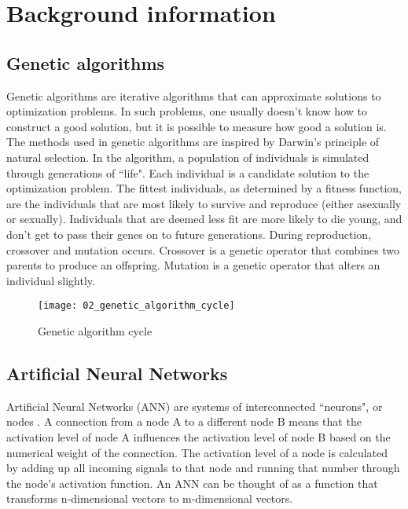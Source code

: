 \chapter{Background information}

\section{Genetic algorithms}
Genetic algorithms \citep{goldberg1989} are iterative algorithms that can approximate solutions to optimization problems. In such problems, one usually doesn’t know how to construct a good solution, but it is possible to measure how good a solution is. The methods used in genetic algorithms are inspired by Darwin's principle of natural selection. In the algorithm, a population of individuals is simulated through generations of ``life". Each individual is a candidate solution to the optimization problem. The fittest individuals, as determined by a fitness function, are the individuals that are most likely to survive and reproduce (either asexually or sexually). Individuals that are deemed less fit are more likely to die young, and don't get to pass their genes on to future generations. During reproduction, crossover and mutation occurs. Crossover is a genetic operator that combines two parents to produce an offspring. Mutation is a genetic operator that alters an individual slightly.

\begin{figure}[h]
    \centering
    \texttt{[image: 02\_genetic\_algorithm\_cycle]}
    \caption{Genetic algorithm cycle}
    \label{fig:genetic_algorithm_cycle}
\end{figure}

\section{Artificial Neural Networks}
Artificial Neural Networks (ANN) are systems of interconnected ``neurons", or nodes \citep{caudill1987}. A connection from a node A to a different node B means that the activation level of node A influences the activation level of node B based on the numerical weight of the connection. The activation level of a node is calculated by adding up all incoming signals to that node and running that number through the node's activation function. An ANN can be thought of as a function that transforms n-dimensional vectors to m-dimensional vectors.

